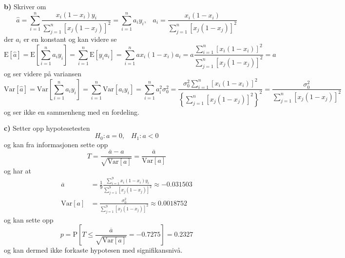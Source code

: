\documentclass{report}
\newcommand{\bbrack}[1]{\left[ #1 \right]}
\newcommand{\cbrack}[1]{\left\lbrace #1 \right\rbrace}
\newcommand{\Var}[1]{\text{Var} \bbrack{ #1 }}
\newcommand{\fvv}[1]{\text{E} \bbrack{ #1 }}
\newcommand{\Prob}[1]{\text{P} \bbrack{ #1 }}
\begin{document}
\textbf{b)}
Skriver om
\begin{equation}
  \label{eq:18}
  \hat{a} = \sum_{i=1}^{n}  \frac{x_{i}(1 - x_{i})y_{i} }{ \sum_{j=1}^{n} \bbrack{ x_{j} (1-x_{j}) }^{2} } = \sum_{i=1}^{n} a_{i} y_{i}, \;\;\; a_{i} = \frac{x_{i}(1 - x_{i})}{ \sum_{j=1}^{n} \bbrack{ x_{j} (1-x_{j}) }^{2} }
\end{equation}
der $a_{i}$ er en konstant og kan videre se
\begin{equation}
  \label{eq:17}
  \fvv{\hat{a}} = \fvv{ \sum_{i=1}^{n} a_{i} y_{i} } = \sum_{i=1}^{n} \fvv{ y_{i} a_{i} } = \sum_{i=1}^{n}ax_{i}(1-x_{i}) a_{i} = a \frac{ \sum_{i=1}^{n} \bbrack{ x_{i}(1-x_{i}) }^{2} }{ \sum_{j=1}^{n} \bbrack{ x_{j}(1-x_{j}) }^{2} } = a
\end{equation}
og ser videre på variansen
\begin{equation}
  \label{eq:19}
  \Var{ \hat{a} } = \Var{ \sum_{i=1}^{n} a_{i} y_{i} } = \sum_{i=1}^{n} \Var{ a_{i} y_{i} } = \sum_{i=1}^{n} a_{i}^{2} \sigma_{0}^{2} = \frac{\sigma_{0}^{2} \sum_{i=1}^{n} \bbrack{x_{i}(1 - x_{i})}^{2}}{ \cbrack{ \sum_{j=1}^{n} \bbrack{ x_{j} (1-x_{j}) }^{2} }^{2} } = \frac{\sigma_{0}^{2}}{ \sum_{j=1}^{n} \bbrack{ x_{j}(1-x_{j}) }^{2} }
\end{equation}
og ser ikke en sammenheng med en fordeling.

\textbf{c)}
Setter opp hypotesetesten
\begin{equation}
  \label{eq:20}
  H_{0} : a = 0, \;\;\; H_{1} : a < 0
\end{equation}
og kan fra informasjonen sette opp
\begin{equation}
  \label{eq:21}
  T = \frac{\overline{a} - a}{\sqrt{\Var{a}}} = \frac{\overline{a}}{\Var{a}}
\end{equation}
og har at
\begin{equation}
  \label{eq:22}
  \begin{split}
    \overline{a} &= \frac{1}{9} \frac{\sum_{i=1}^{9} x_{i}(1-x_{i})y_{i} }{ \sum_{j=1}^{9} \bbrack{ x_{j} (1-x_{j}) }^{2} } \approx -0.031503 \\
    \Var{a} &= \frac{\sigma_{0}^{2}}{\sum_{j=1}^{9} \bbrack{ x_{j}(1-x_{j}) }^{2}} \approx 0.0018752
  \end{split}
\end{equation}
og kan sette opp
\begin{equation}
  \label{eq:23}
  p = \Prob{ T \leq \frac{\overline{a}}{\sqrt{\Var{a}}} = -0.7275 } = 0.2327
\end{equation}
og kan dermed ikke forkaste hypotesen med signifikansnivå.
\end{document}
